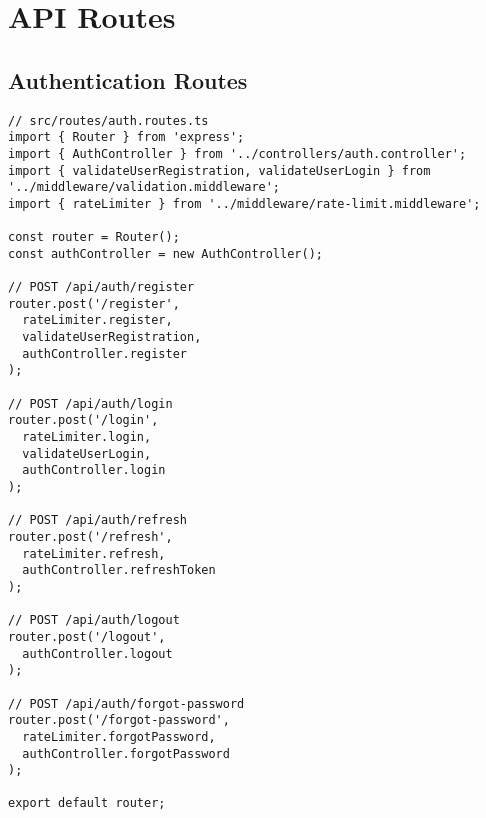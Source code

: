 \documentclass[12pt,a4paper]{article}
\begin{document}
\section{API Routes}

\subsection{Authentication Routes}
\begin{lstlisting}[caption=Auth API Routes]
// src/routes/auth.routes.ts
import { Router } from 'express';
import { AuthController } from '../controllers/auth.controller';
import { validateUserRegistration, validateUserLogin } from '../middleware/validation.middleware';
import { rateLimiter } from '../middleware/rate-limit.middleware';

const router = Router();
const authController = new AuthController();

// POST /api/auth/register
router.post('/register', 
  rateLimiter.register,
  validateUserRegistration,
  authController.register
);

// POST /api/auth/login
router.post('/login',
  rateLimiter.login,
  validateUserLogin,
  authController.login
);

// POST /api/auth/refresh
router.post('/refresh',
  rateLimiter.refresh,
  authController.refreshToken
);

// POST /api/auth/logout
router.post('/logout',
  authController.logout
);

// POST /api/auth/forgot-password
router.post('/forgot-password',
  rateLimiter.forgotPassword,
  authController.forgotPassword
);

export default router;
\end{lstlisting}
\end{document}
